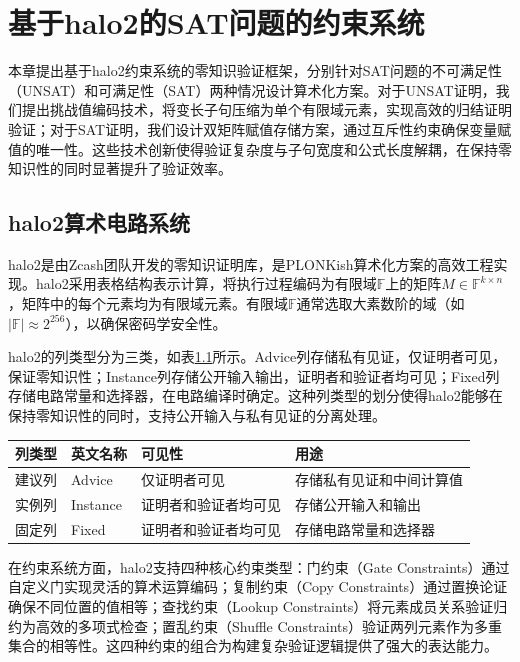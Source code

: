 
\chapter{基于halo2的SAT问题的约束系统}

本章提出基于halo2约束系统的零知识验证框架，分别针对SAT问题的不可满足性（UNSAT）和可满足性（SAT）两种情况设计算术化方案。对于UNSAT证明，我们提出挑战值编码技术，将变长子句压缩为单个有限域元素，实现高效的归结证明验证；对于SAT证明，我们设计双矩阵赋值存储方案，通过互斥性约束确保变量赋值的唯一性。这些技术创新使得验证复杂度与子句宽度和公式长度解耦，在保持零知识性的同时显著提升了验证效率。

\section{halo2算术电路系统}

halo2是由Zcash团队开发的零知识证明库，是PLONKish算术化方案的高效工程实现\cite{halo2}。halo2采用表格结构表示计算，将执行过程编码为有限域$\mathbb{F}$上的矩阵$M \in \mathbb{F}^{k \times n}$，矩阵中的每个元素均为有限域元素。有限域$\mathbb{F}$通常选取大素数阶的域（如$|\mathbb{F}| \approx 2^{256}$），以确保密码学安全性。

halo2的列类型分为三类，如表\ref{tab:halo2-columns}所示。Advice列存储私有见证，仅证明者可见，保证零知识性；Instance列存储公开输入输出，证明者和验证者均可见；Fixed列存储电路常量和选择器，在电路编译时确定。这种列类型的划分使得halo2能够在保持零知识性的同时，支持公开输入与私有见证的分离处理。

\begin{table}[htbp]
\centering
{}
\label{tab:halo2-columns}
\begin{tabular}{llll}
\toprule
\textbf{列类型} & \textbf{英文名称} & \textbf{可见性} & \textbf{用途} \\
\midrule
建议列 & Advice & 仅证明者可见 & 存储私有见证和中间计算值 \\
实例列 & Instance & 证明者和验证者均可见 & 存储公开输入和输出 \\
固定列 & Fixed & 证明者和验证者均可见 & 存储电路常量和选择器 \\
\bottomrule
\end{tabular}
\end{table}

在约束系统方面，halo2支持四种核心约束类型：门约束（Gate Constraints）通过自定义门实现灵活的算术运算编码；复制约束（Copy Constraints）通过置换论证确保不同位置的值相等；查找约束（Lookup Constraints）将元素成员关系验证归约为高效的多项式检查；置乱约束（Shuffle Constraints）验证两列元素作为多重集合的相等性。这四种约束的组合为构建复杂验证逻辑提供了强大的表达能力。

